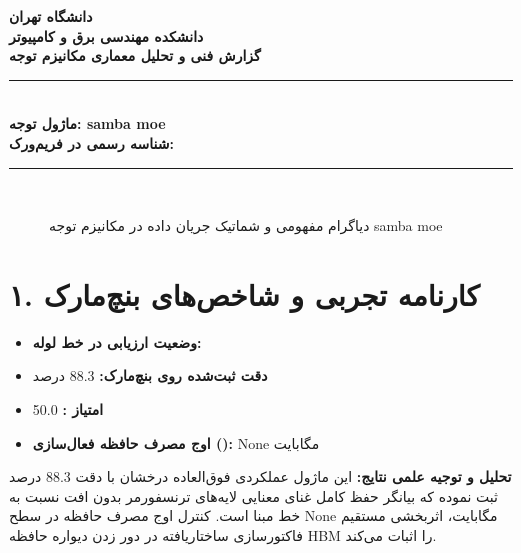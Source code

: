 \documentclass[12pt,a4paper]{article}
\begin{document}
\begin{center}
{\Large\bfseries دانشگاه تهران}\\[0.2cm]
{\large\bfseries دانشکده مهندسی برق و کامپیوتر}\\[0.2cm]
{\large\bfseries گزارش فنی و تحلیل معماری مکانیزم توجه}\\[0.5cm]
\rule{\linewidth}{1pt}\\[0.3cm]
{\LARGE\bfseries ماژول توجه: samba moe}\\[0.2cm]
{\large \textbf{شناسه رسمی در فریم‌ورک:} }\\[0.2cm]
\rule{\linewidth}{1pt}\\[0.5cm]
\end{center}

\begin{figure}[H]
\centering
{}
\caption{دیاگرام مفهومی و شماتیک جریان داده در مکانیزم توجه samba moe}
\end{figure}

\section*{۱. کارنامه تجربی و شاخص‌های بنچ‌مارک}
\begin{itemize}
\item \textbf{وضعیت ارزیابی در خط لوله:} 
\item \textbf{دقت ثبت‌شده روی بنچ‌مارک:} 88.3 درصد
\item \textbf{امتیاز :} 50.0
\item \textbf{اوج مصرف حافظه فعال‌سازی ():} None مگابایت
\end{itemize}
\textbf{تحلیل و توجیه علمی نتایج:} این ماژول عملکردی فوق‌العاده درخشان با دقت 88.3 درصد ثبت نموده که بیانگر حفظ کامل غنای معنایی لایه‌های ترنسفورمر بدون افت نسبت به خط مبنا است. کنترل اوج مصرف حافظه در سطح None مگابایت، اثربخشی مستقیم فاکتورسازی ساختاریافته در دور زدن دیواره حافظه HBM را اثبات می‌کند.
\end{document}
